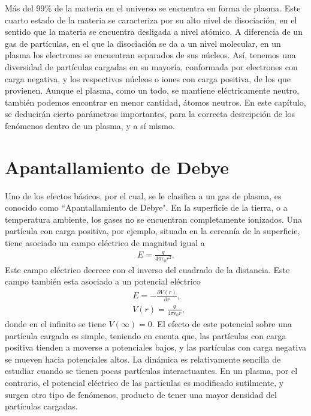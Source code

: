 \documentclass[../main.tex]{subfiles}
\begin{document}
    Más del 99\% de la materia en el universo se encuentra en forma de plasma. Este cuarto estado de la materia se caracteriza por su alto nivel de disociación, en el sentido que la materia se encuentra desligada a nivel atómico. A diferencia de un gas de partículas, en el que la disociación se da a un nivel molecular, en un plasma los electrones se encuentran separados de sus núcleos. Así, tenemos una diversidad de partículas cargadas en su mayoría, conformada por electrones con carga negativa, y los respectivos núcleos o iones con carga positiva, de los que provienen. Aunque el plasma, como un todo, se mantiene eléctricamente neutro, también podemos encontrar en menor cantidad, átomos neutros. En este capítulo, se deducirán cierto parámetros importantes, para la correcta desrcipción de los fenómenos dentro de un plasma, y a sí mismo.

    \section{Apantallamiento de Debye}

    Uno de los efectos básicos, por el cual, se le clasifica a un gas de plasma, es conocido como ``Apantallamiento de Debye". En la superficie
    de la tierra, o a temperatura ambiente, los gases no se encuentran completamente ionizados. Una partícula con carga positiva, por ejemplo,
    situada en la cercanía de la superficie, tiene asociado un campo eléctrico de magnitud igual a
        \begin{align} \label{pot_elec}
            E = \frac{q}{4\pi\epsilon_{0}r^2}.
        \end{align}
    Este campo eléctrico decrece con el inverso del cuadrado de la distancia. Este campo también esta asociado a un potencial eléctrico
        \begin{align}
            &E = -\frac{\partial V(r)}{\partial r}, \\
            &V(r) = \frac{q}{4\pi \epsilon_0 r},
        \end{align}
    donde en el infinito se tiene $V(\infty) = 0$. El efecto de este potencial sobre una partícula cargada es simple, teniendo en cuenta que, las partículas con carga positiva tienden a moverse a potenciales bajos, y las partículas con carga negativa se mueven hacia potenciales altos. La dinámica es relativamente sencilla de estudiar cuando se tienen pocas partículas interactuantes. En un plasma, por el contrario, el potencial eléctrico de las partículas es modificado sutilmente, y surgen otro tipo de fenómenos, producto de tener una mayor densidad del partículas cargadas. \\
    
\end{document}
